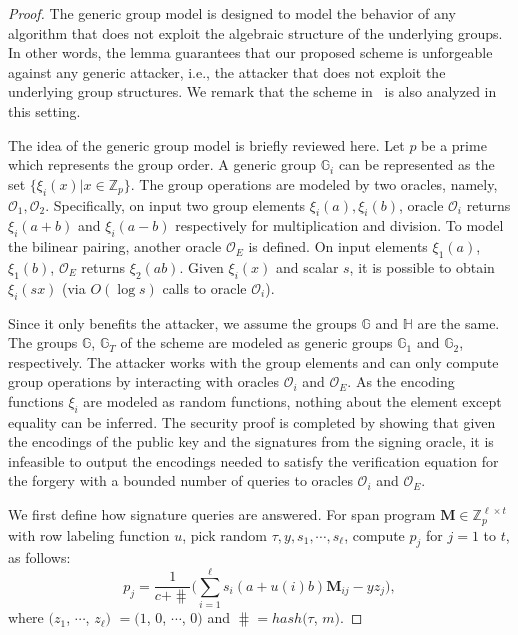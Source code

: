 \begin{proof}
  The generic group model is designed to model the behavior of any algorithm that does not exploit the algebraic structure of the underlying groups. In other words, the lemma guarantees that our proposed scheme is unforgeable against any generic attacker, i.e., the attacker that does not exploit the underlying group structures. We remark that the scheme in~\cite{10.1007/978-3-642-19074-2_24} is also analyzed in this setting.

  The idea of the generic group model is briefly reviewed here. Let $p$ be a prime which represents the group order. A generic group $\mathbb{G}_i$ can be represented as the set $\{\xi_i(x)| x\in\mathbb{Z}_p\}$. The group operations are modeled by two oracles, namely, $\mathcal{O}_1, \mathcal{O}_2$. Specifically, on input two group elements $\xi_i(a), \xi_i(b)$, oracle $\mathcal{O}_i$ returns $\xi_i(a+b)$ and $\xi_i(a-b)$ respectively for multiplication and division. To model the bilinear pairing, another oracle $\mathcal{O}_E$ is defined. On input elements $\xi_1(a)$, $\xi_1(b)$, $\mathcal{O}_E$ returns $\xi_2(ab)$.  Given $\xi_i(x)$ and scalar $s$, it is possible to obtain $\xi_i(sx)$ (via $O(\log s)$ calls to oracle $\mathcal{O}_i$).

  Since it only benefits the attacker, we assume the groups $\mathbb{G}$ and $\mathbb{H}$ are the same. The groups $\mathbb{G}$, $\mathbb{G}_T$ of the scheme are modeled as generic groups $\mathbb{G}_1$ and $\mathbb{G}_2$, respectively. The attacker works with the group elements and can only compute group operations by interacting with oracles $\mathcal{O}_i$ and $\mathcal{O}_E$. As the encoding functions $\xi_i$ are modeled as random functions, nothing about the element except equality can be inferred. The security proof is completed by showing that given the encodings of the public key and the signatures from the signing oracle, it is infeasible to output the encodings needed to satisfy the verification equation for the forgery with a bounded number of queries to oracles $\mathcal{O}_i$ and $\mathcal{O}_E$.

  We first define how signature queries are answered. For span program $\mathbf{M}\in \mathbb{Z}_p^{\ell \times t}$ with row labeling function $u$, pick random $\tau, y, s_1, \cdots, s_\ell$, compute $p_j$ for $j=1$ to $t$, as follows:
  $$
  p_j = \frac{1}{c + \hash}\big(\sum_{i=1}^\ell s_i (a+u(i)b)\mathbf{M}_{ij} - yz_j\big),
  $$ where $(z_1$, $\cdots$, $z_\ell)$ $= (1$, $0$, $\cdots$, $0)$ and $\hash = hash(\tau$, $m)$.


\end{proof}
